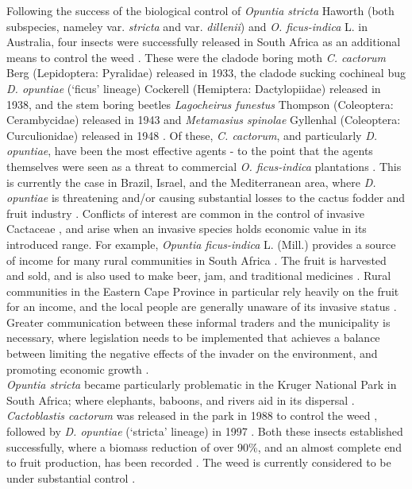 Following the success of the biological control of \textit{Opuntia stricta} Haworth (both subspecies, nameley var. \textit{stricta} and var. \textit{dillenii}) and \textit{O. ficus-indica} L. in Australia, four insects were successfully released in South Africa as an additional means to control the weed \citep{Annecke1978,Zimmermann1991BiologicalAfrica}. These were the cladode boring moth \textit{C. cactorum} Berg (Lepidoptera: Pyralidae) released in 1933, the cladode sucking cochineal bug \textit{D. opuntiae} (`ficus' lineage) Cockerell (Hemiptera: Dactylopiidae) released in 1938, and the stem boring beetles \textit{Lagocheirus funestus} Thompson (Coleoptera: Cerambycidae) released in 1943 and \textit{Metamasius spinolae} Gyllenhal (Coleoptera: Curculionidae) released in 1948 \citep{Klein2011}. Of these, \textit{C. cactorum}, and particularly \textit{D. opuntiae}, have been the most effective agents - to the point that the agents themselves were seen as a threat to commercial \textit{O. ficus-indica} plantations \citep{Zimmermann1991BiologicalAfrica}. This is currently the case in Brazil, Israel, and the Mediterranean area, where \textit{D. opuntiae} is threatening and/or causing substantial losses to the cactus fodder and fruit industry \citep{spodek2014first, torres2018management, mazzeo2019dactylopius}. Conflicts of interest are common in the control of invasive Cactaceae \citep{novoa2016resolving}, and arise when an invasive species holds economic value in its introduced range. 
For example, \textit{Opuntia ficus-indica} L. (Mill.) provides a source of income for many rural communities in South Africa \citep{Brutsch1993ThePlants, Beinart2011}. The fruit is harvested and sold, and is also used to make beer, jam, and traditional medicines \citep{Brutsch1993ThePlants, shackleton2011invasive}. Rural communities in the Eastern Cape Province in particular rely heavily on the fruit for an income, and the local people are generally unaware of its invasive status  \citep{shackleton2007assessing}. Greater communication between these informal traders and the municipality is necessary, where legislation needs to be implemented that achieves a balance between limiting the negative effects of the invader on the environment, and promoting economic growth \citep{shackleton2011invasive}. \\ 
\textit{Opuntia stricta} became particularly problematic in the Kruger National Park in South Africa; where elephants, baboons, and rivers aid in its dispersal \citep{hoffmann1998long}. \textit{Cactoblastis cactorum} was released in the park in 1988 to control the weed  \citep{Hoffmann1998EvaluationAfrica}, followed by \textit{D. opuntiae} (`stricta' lineage) in 1997 \citep{Klein2011}. Both these insects established successfully, where a biomass reduction of over 90\%, and an almost complete end to fruit production, has been recorded \citep{Paterson2011BiologicalAfrica}. The weed is currently considered to be under substantial control \citep{Klein2011}. \\
